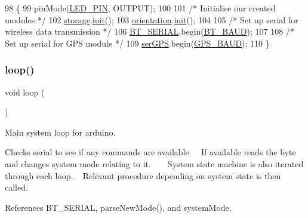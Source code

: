\begin{DoxyCode}
98 \{
99   pinMode(\hyperlink{logging-device_8ino_ab4553be4db9860d940f81d7447173b2f}{LED\_PIN}, OUTPUT);
100 
101   \textcolor{comment}{/* Initialise our created modules */}
102   \hyperlink{logging-device_8ino_a40059244119c00baa1b841119cfd1b2e}{storage}.\hyperlink{class_storage_a98b01eb20a64a4bf4127685147f7f6f1}{init}();
103   \hyperlink{logging-device_8ino_a47be0262307aa023a1bda3d98986a16d}{orientation}.\hyperlink{class_orientation_a317461c5c8afa8c3abf56847d4544728}{init}();
104 
105   \textcolor{comment}{/* Set up serial for wireless data transmission */}
106   \hyperlink{logging-device_8ino_ad1e6e6f6fc813b305067b9e1b0777ea6}{BT\_SERIAL}.begin(\hyperlink{logging-device_8ino_a6882992121626898bccaa43be51ba4c2}{BT\_BAUD});
107 
108   \textcolor{comment}{/* Set up serial for GPS module */}
109   \hyperlink{logging-device_8ino_aa2475f51bdc0f31d16d2916991d618d9}{serGPS}.begin(\hyperlink{logging-device_8ino_af0875ffe69dbe45df3f85c1f720c3eee}{GPS\_BAUD});
110 \}
\end{DoxyCode}
\mbox{\label{logging-device_8ino_afe461d27b9c48d5921c00d521181f12f}} 
\subsubsection{\texorpdfstring{loop()}{loop()}}
{\footnotesize\ttfamily void loop (\begin{DoxyParamCaption}{ }\end{DoxyParamCaption})}



Main system loop for arduino. 

Checks serial to see if any commands are available. ~\newline
If available reads the byte and changes system mode relating to it. ~\newline
~\newline
System state machine is also iterated through each loop. ~\newline
Relevant procedure depending on system state is then called. 

References B\+T\+\_\+\+S\+E\+R\+I\+AL, parse\+New\+Mode(), and system\+Mode.


